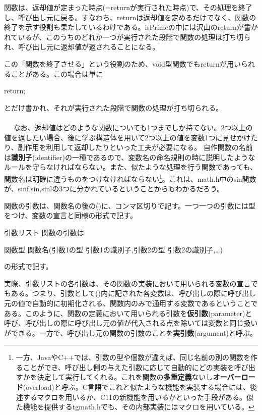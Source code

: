関数は、返却値が定まった時点(=returnが実行された時点)で、その処理を終了し、呼び出し元に戻る。すなわち、returnは返却値を定めるだけでなく、関数の終了を示す役割も果たしているわけである。isPrimeの中には沢山のreturnが書かれているが、このうちのどれか一つが実行された段階で関数の処理は打ち切られ、呼び出し元に返却値が返されることになる。

この「関数を終了させる」という役割のため、void型関数でもreturnが用いられることがある。この場合は単に
\begin{code}
return;
\end{code}
とだけ書かれ、それが実行された段階で関数の処理が打ち切られる。
\\ \\　
なお、返却値はどのような関数についても1つまでしか持てない。2つ以上の値を返したい場合、後に学ぶ構造体を用いて2つ以上の値を変数1つに見せかけたり、副作用を利用して返却したりといった工夫が必要になる。
自作関数の名前は\textbf{識別子}(identifier)の一種であるので、変数名の命名規則の時に説明したようなルールを守らなければならない。また、似たような処理を行う関数であっても、関数名は明確に違うものをつけなければならない\footnote{一方、JavaやC++では、引数の型や個数が違えば、同じ名前の別の関数を作ることができ、呼び出し側の与えた引数に応じて自動的にどの実装を呼び出すかを決定して実行してくれる。これを関数の\textbf{多重定義}ないし\textbf{オーバーロード}(overload)と呼ぶ。C言語でこれと似たような機能を実装する場合には、後述するマクロを用いるか、C11の新機能を用いるかといった手段がある。似た機能を提供するtgmath.hでも、その内部実装にはマクロを用いている。}。これは、math.h中のsin関数が、sinf,sin,sinlの3つに分かれているということからもわかるだろう。

関数の引数は、関数名の後の()に、コンマ区切りで記す。一つ一つの引数には型をつけ、変数の宣言と同様の形式で記す。
\begin{itembox}[l]{引数リスト}
関数の引数は
\begin{code}
関数型 関数名(引数1の型 引数1の識別子,引数2の型 引数2の識別子,…)
\end{code}
の形式で記す。
\end{itembox}
実際、引数リストの各引数は、その関数の実装において用いられる変数の宣言でもある。つまり、引数として()内に記された各変数は、呼び出しの際に呼び出し元の値で自動的に初期化される、関数内のみで通用する変数であるということである。このように、関数の定義において用いられる引数を\textbf{仮引数}(parameter)と呼び、呼び出しの際に呼び出し元の値が代入される点を除いては変数と同じ扱いができる。一方で、呼び出し元の関数の引数のことを\textbf{実引数}(argument)と呼ぶ。

